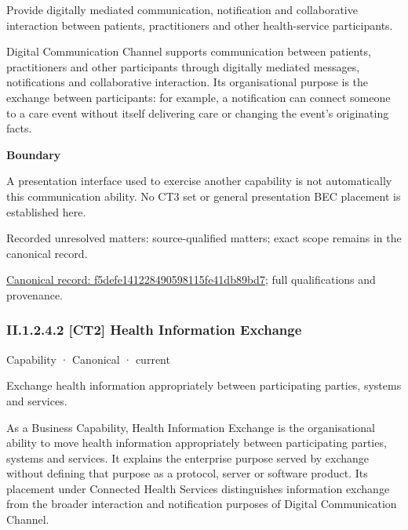 Provide digitally mediated communication, notification and collaborative interaction between patients, practitioners and other health-service participants.



Digital Communication Channel supports communication between patients, practitioners and other participants through digitally mediated messages, notifications and collaborative interaction. Its organisational purpose is the exchange between participants: for example, a notification can connect someone to a care event without itself delivering care or changing the event's originating facts.



\textbf{Boundary}



A presentation interface used to exercise another capability is not automatically this communication ability. No CT3 set or general presentation BEC placement is established here.


{\small Recorded unresolved matters: source-qualified matters; exact scope remains in the canonical record.}\par
{\footnotesize \href{../../../../continuum/strategy/capability/f5defe141228490598115fe41db89bd7.md}{Canonical record: f5defe141228490598115fe41db89bd7}; full qualifications and provenance.}\par
\subsubsection*{II.1.2.4.2 [CT2] Health Information Exchange}
\label{navigation:II.1.2.4.2}

\label{element:baad6b6117084311acbf5fc4044dfabf}
{\small Capability · Canonical · current}\par

Exchange health information appropriately between participating parties, systems and services.



As a Business Capability, Health Information Exchange is the organisational ability to move health information appropriately between participating parties, systems and services. It explains the enterprise purpose served by exchange without defining that purpose as a protocol, server or software product. Its placement under Connected Health Services distinguishes information exchange from the broader interaction and notification purposes of Digital Communication Channel.



